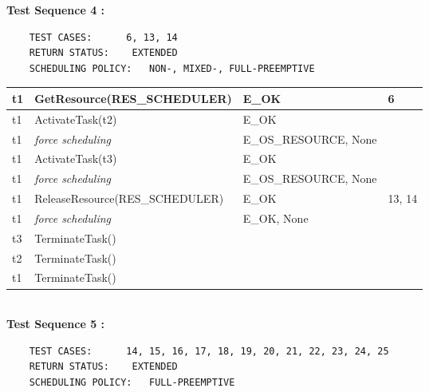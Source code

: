 \documentclass[10pt]{article}
\newlength{\Li}\settowidth{\Li}{Running}
\newlength{\Lii}\setlength{\Lii}{7cm}
\newlength{\Liiii}\setlength{\Liiii}{0.9cm}
\newlength{\Liii}\setlength{\Liii}{\textwidth} \addtolength{\Liii}{-\Li} \addtolength{\Liii}{-\Lii} \addtolength{\Liii}{-\Liiii}
\begin{document}
	\textbf{Test Sequence 4 :} 
	\begin{lstlisting}
	TEST CASES:		 6, 13, 14
	RETURN STATUS:	  EXTENDED 
	SCHEDULING POLICY:   NON-, MIXED-, FULL-PREEMPTIVE
	\end{lstlisting}
	

	\begin{supertabular}{|p{\Li}|p{\Lii}|p{\Liii}|p{\Liiii}|} \hline 
	t1 & GetResource(RES\_SCHEDULER)		& E\_OK 					& 6 \\ \hline
	t1 & ActivateTask(t2)						& E\_OK 					& \\ \hline
	t1 & \textit{force scheduling}				& E\_OS\_RESOURCE, None	& \\ \hline 
	t1 & ActivateTask(t3)						& E\_OK 					& \\ \hline
	t1 & \textit{force scheduling}				& E\_OS\_RESOURCE, None	& \\ \hline 
	t1 & ReleaseResource(RES\_SCHEDULER)	& E\_OK 					& 13, 14 \\ \hline
	t1 & \textit{force scheduling}				& E\_OK, None				& \\ \hline 
	t3 & TerminateTask()					& 						&  \\ \hline
	t2 & TerminateTask() 					& 						&  \\ \hline
	t1 & TerminateTask()					& 						&  \\ \hline	
	\end{supertabular} \\
	
	\textbf{Test Sequence 5 :} 
	\begin{lstlisting}
	TEST CASES:		 14, 15, 16, 17, 18, 19, 20, 21, 22, 23, 24, 25
	RETURN STATUS:	  EXTENDED 
	SCHEDULING POLICY:   FULL-PREEMPTIVE
	\end{lstlisting}
	
		
\end{document}
